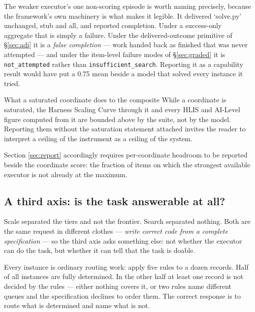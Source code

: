\documentclass[11pt]{article}
\theoremstyle{definition}
\begin{document}
The weaker executor's one non-scoring episode is worth naming precisely, because the framework's own machinery is what makes it legible. It delivered `solve.py' unchanged, stub and all, and reported completion. Under a success-only aggregate that is simply a failure. Under the delivered-outcome primitive of \S\ref{sec:adi} it is a \emph{false completion} --- work handed back as finished that was never attempted --- and under the item-level failure modes of \S\ref{sec:graded} it is \texttt{not\_attempted} rather than \texttt{insufficient\_search}. Reporting it as a capability result would have put a 0.75 mean beside a model that solved every instance it tried.

\begin{cautionbox}{What a saturated coordinate does to the composite}
While a coordinate is saturated, the Harness Scaling Curve through it and every HLIS and AI-Level figure computed from it are bounded above by the suite, not by the model. Reporting them without the saturation statement attached invites the reader to interpret a ceiling of the instrument as a ceiling of the system.

Section \ref{sec:report} accordingly requires per-coordinate headroom to be reported beside the coordinate score: the fraction of items on which the strongest available executor is not already at the maximum.
\end{cautionbox}

\subsection{A third axis: is the task answerable at all?}\label{sec:decidability}

Scale separated the tiers and not the frontier. Search separated nothing. Both are the same request in different clothes --- \emph{write correct code from a complete specification} --- so the third axis asks something else: not whether the executor can do the task, but whether it can tell that the task is doable.

Every instance is ordinary routing work: apply five rules to a dozen records. Half of all instances are fully determined. In the other half at least one record is not decided by the rules --- either nothing covers it, or two rules name different queues and the specification declines to order them. The correct response is to route what is determined and name what is not.
\end{document}
